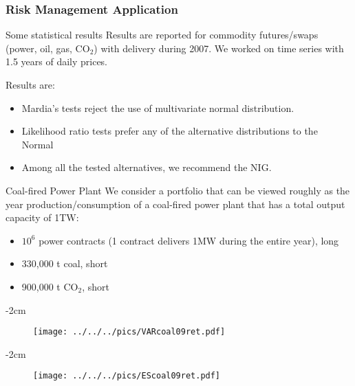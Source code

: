 \subsubsection{Risk Management Application}

{Some statistical results} %
Results are reported for commodity futures/swaps (power, oil, gas,
CO$_2$) with delivery during 2007. We worked on time series with
1.5 years of daily prices.

Results are: %
\begin{itemize}
\item Mardia's tests reject the use of multivariate normal distribution.\\[-1.3cm]
\item Likelihood ratio tests prefer any of the alternative distributions to the Normal\\[-1.3cm]
\item Among all the tested alternatives, we recommend the NIG.
\end{itemize}



{Coal-fired Power Plant} We consider a portfolio
that can be viewed roughly as the year production/consumption of a
coal-fired power plant that has a total output capacity of 1TW:
\begin{itemize}
\item $10^6$ power contracts (1 contract delivers 1MW during the entire year), long \\[-1.5cm]
\item 330,000 t coal, short\\[-1.5cm]
\item 900,000 t CO$_2$, short
\end{itemize}


{-2cm}
\begin{figure}
\begin{center}
\texttt{[image: ../../../pics/VARcoal09ret.pdf]}
\end{center}
\end{figure}


{-2cm}
\begin{figure}
\begin{center}
\texttt{[image: ../../../pics/EScoal09ret.pdf]}
\end{center}
\end{figure}


